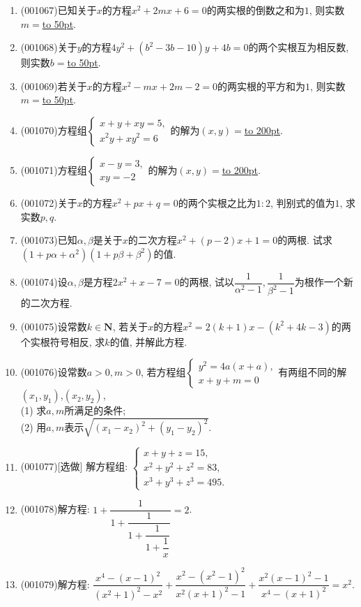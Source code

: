 \documentclass[10pt,a4paper]{article}
\newcommand{\blank}[1]{\underline{\hbox to #1pt{}}}
\begin{document}
\begin{enumerate}[1.]
\item {\tiny (001067)}已知关于$x$的方程$x^2+2mx+6=0$的两实根的倒数之和为$1$, 则实数$m=$\blank{50}.
\item {\tiny (001068)}关于$y$的方程$4y^2+(b^2-3b-10)y+4b=0$的两个实根互为相反数, 则实数$b=$\blank{50}.
\item {\tiny (001069)}若关于$x$的方程$x^2-mx+2m-2=0$的两实根的平方和为$1$, 则实数$m=$\blank{50}.
\item {\tiny (001070)}方程组$\left\{
\begin{array}{l}
x+y+xy=5,\\
x^2y+xy^2=6
\end{array}
\right.$的解为$(x,y)=$\blank{200}.
\item {\tiny (001071)}方程组$\left\{
\begin{array}{l}
x-y=3,\\
xy=-2
\end{array}
\right.$的解为$(x,y)=$\blank{200}.
\item {\tiny (001072)}关于$x$的方程$x^2+px+q=0$的两个实根之比为$1:2$, 判别式的值为$1$, 求实数$p,q$.
\item {\tiny (001073)}已知$\alpha,\beta$是关于$x$的二次方程$x^2+(p-2)x+1=0$的两根. 试求$(1+p\alpha+\alpha^2)(1+p\beta+\beta^2)$的值.
\item {\tiny (001074)}设$\alpha,\beta$是方程$2x^2+x-7=0$的两根, 试以$\dfrac{1}{\alpha^2-1},\dfrac{1}{\beta^2-1}$为根作一个新的二次方程.
\item {\tiny (001075)}设常数$k\in\mathbf{N}$, 若关于$x$的方程$x^2=2(k+1)x-(k^2+4k-3)$的两个实根符号相反, 求$k$的值,
并解此方程.
\item {\tiny (001076)}设常数$a>0,m>0$, 若方程组$\left\{
\begin{array}{l}
y^2=4a(x+a),\\
x+y+m=0
\end{array}
\right.$有两组不同的解$(x_1,y_1)$,$(x_2,y_2)$,\\ 
(1) 求$a,m$所满足的条件;\\ 
(2) 用$a,m$表示$\sqrt{(x_1-x_2)^2+(y_1-y_2)^2}$.
\item {\tiny (001077)}[选做]
解方程组: $\left\{
\begin{array}{l}
x+y+z=15,\\
x^2+y^2+z^2=83,\\
x^3+y^3+z^3=495.
\end{array}\right.$
\item {\tiny (001078)}解方程: $1+\dfrac{1}{1+\dfrac{1}{1+\dfrac{1}{1+\dfrac{1}{x}}}}=2$.
\item {\tiny (001079)}解方程: $\dfrac{x^4-(x-1)^2}{(x^2+1)^2-x^2}+\dfrac{x^2-(x^2-1)^2}{x^2(x+1)^2-1}+\dfrac{x^2(x-1)^2-1}{x^4-(x+1)^2}=x^2$.

\end{enumerate}
\end{document}
